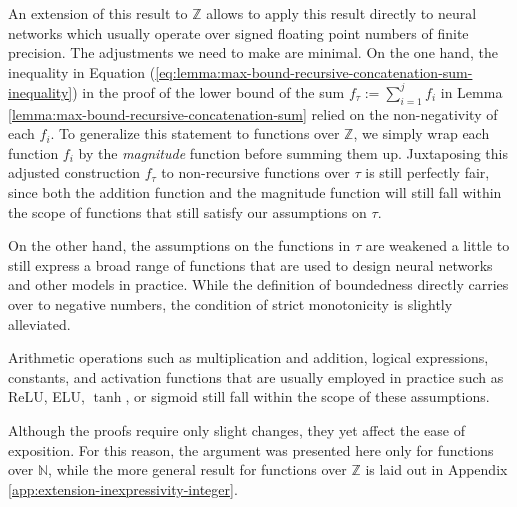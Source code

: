 An extension of this result to $\mathbb{Z}$ allows to apply this result directly to neural networks which usually operate over signed floating point numbers of finite precision.
The adjustments we need to make are minimal.
On the one hand, the inequality in Equation (\ref{eq:lemma:max-bound-recursive-concatenation-sum-inequality}) in the proof of the lower bound of the sum $f_\tau:=\sum_{i=1}^{j}f_i$ in Lemma \ref{lemma:max-bound-recursive-concatenation-sum} relied on the non-negativity of each $f_i$.
To generalize this statement to functions over $\mathbb{Z}$, we simply wrap each function $f_i$ by the \textit{magnitude} function before summing them up.
Juxtaposing this adjusted construction $f_{\tau}$ to non-recursive functions over $\tau$ is still perfectly fair, since both the addition function and the magnitude function will still fall within the scope of functions that still satisfy our assumptions on $\tau$.

On the other hand, the assumptions on the functions in $\tau$ are weakened a little to still express a broad range of functions that are used to design neural networks and other models in practice.
While the definition of boundedness directly carries over to negative numbers, the condition of strict monotonicity is slightly alleviated.

Arithmetic operations such as multiplication and addition, logical expressions, constants, and activation functions that are usually employed in practice such as ReLU, ELU, $\tanh$, or sigmoid still fall within the scope of these assumptions.

Although the proofs require only slight changes, they yet affect the ease of exposition.
For this reason, the argument was presented here only for functions over $\mathbb{N}$, while the more general result for functions over $\mathbb{Z}$ is laid out in Appendix \ref{app:extension-inexpressivity-integer}.

